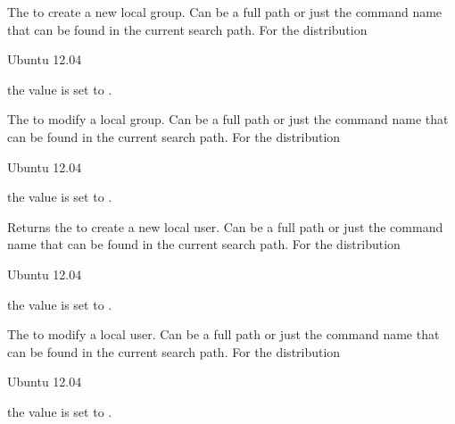 
The  to create a new local group. Can be a full path or
just the command name that can be found in the current search path. 
For the distribution
\begin{inparaitem}
\item[\TheDistribution{ubuntu}] Ubuntu 12.04
\end{inparaitem}
the value is set to .


The  to modify a local group. Can be a full path or
just the command name that can be found in the current search path. 
For the distribution
\begin{inparaitem}
\item[\TheDistribution{ubuntu}] Ubuntu 12.04
\end{inparaitem}
the value is set to .


Returns the  to create a new local user. Can be a full path or
just the command name that can be found in the current search path. 
For the distribution
\begin{inparaitem}
\item[\TheDistribution{ubuntu}] Ubuntu 12.04
\end{inparaitem}
the value is set to .


The  to modify a local user. Can be a full path or
just the command name that can be found in the current search path. 
For the distribution
\begin{inparaitem}
\item[\TheDistribution{ubuntu}] Ubuntu 12.04
\end{inparaitem}
the value is set to .


